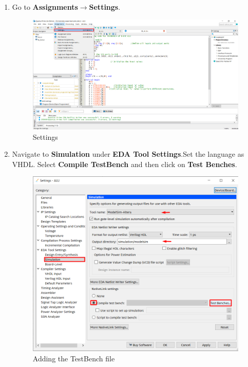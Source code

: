 \documentclass[12pt,singleside,a4paper]{article}
\begin{document}
\begin{enumerate}
    \item Go to \textbf{Assignments}$\rightarrow$\textbf{Settings}.
    \begin{figure}[H]
        \centering
    \includegraphics[width=14cm,keepaspectratio]{test2.png}
    \caption{Settings}
    \end{figure}
    \newpage
    \item Navigate to \textbf{Simulation} under \textbf{EDA Tool Settings}.Set the language as VHDL. Select \textbf{Compile TestBench} and then click on \textbf{Test Benches}.
    \begin{figure}[H]
        \centering
    \includegraphics[width=14cm,keepaspectratio]{test3.png}
    \caption{Adding the TestBench file}
    \end{figure}
  

\end{enumerate}
\end{document}
